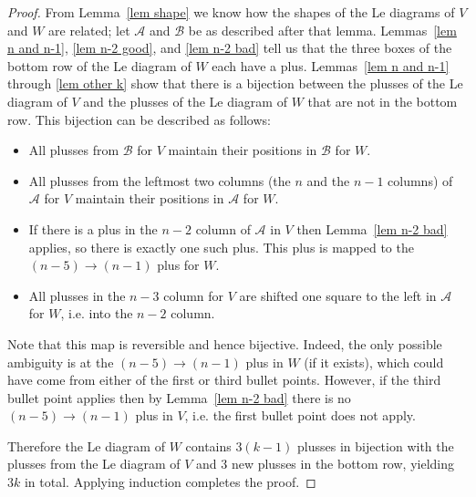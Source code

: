 \documentclass[11pt]{article}
\theoremstyle{remark}
\theoremstyle{definition}
\begin{document}
\begin{proof}
  From Lemma~\ref{lem shape} we know how the shapes of the Le diagrams of $V$ and $W$ are related; let $\mathcal{A}$ and $\mathcal{B}$ be as described after that lemma.  Lemmas~\ref{lem n and n-1}, \ref{lem n-2 good}, and \ref{lem n-2 bad} tell us that the three boxes of the bottom row of the Le diagram of $W$ each have a plus.  Lemmas~\ref{lem n and n-1} through \ref{lem other k} show that there is a bijection between the plusses of the Le diagram of $V$ and the plusses of the Le diagram of $W$ that are not in the bottom row.  This bijection can be described as follows:
  \begin{itemize}
  \item All plusses from $\mathcal{B}$ for $V$ maintain their positions in $\mathcal{B}$ for $W$.
  \item All plusses from the leftmost two columns (the $n$ and the $n-1$ columns) of $\mathcal{A}$ for $V$ maintain their positions in $\mathcal{A}$ for $W$.
  \item If there is a plus in the $n-2$ column of $\mathcal{A}$ in $V$ then Lemma~\ref{lem n-2 bad} applies, so there is exactly one such plus.  This plus is mapped to the $(n-5)\rightarrow (n-1)$ plus for $W$.
  \item All plusses in the $n-3$ column for $V$ are shifted one square to the left in $\mathcal{A}$ for $W$, i.e. into the $n-2$ column.
  \end{itemize}
  Note that this map is reversible and hence bijective. Indeed, the only possible ambiguity is at the $(n-5)\rightarrow (n-1)$ plus in $W$ (if it exists), which could have come from either of the first or third bullet points. However, if the third bullet point applies then by Lemma~\ref{lem n-2 bad} there is no $(n-5)\rightarrow (n-1)$ plus in $V$, i.e. the first bullet point does not apply. 




Therefore the Le diagram of $W$ contains $3(k-1)$ plusses in bijection with the plusses from the Le diagram of $V$ and 3 new plusses in the bottom row, yielding $3k$ in total. Applying induction completes the proof.
\end{proof}
\end{document}
